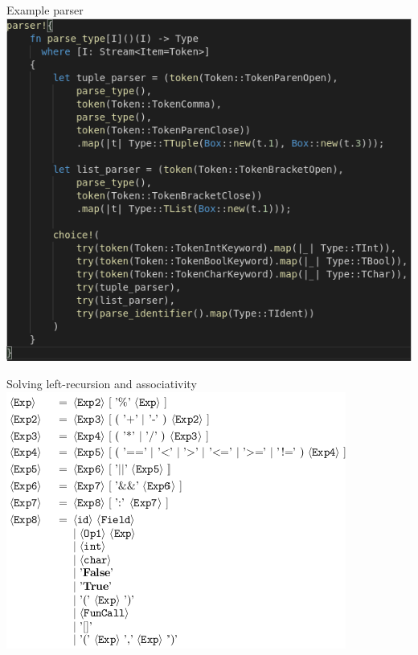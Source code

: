 \documentclass[10pt]{beamer}
\begin{document}
\begin{frame}{Example parser}
    \includegraphics[width=\textwidth]{parse_type.png}
\end{frame}

\begin{frame}{Solving left-recursion and associativity}
    \includegraphics[width=\textwidth]{grammar.png}
\end{frame}
\end{document}
